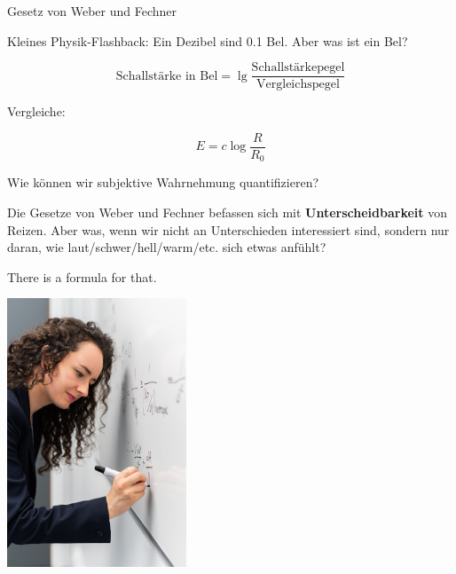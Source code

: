 \documentclass{beamer}
\begin{document}
\begin{frame}{Gesetz von Weber und Fechner}

Kleines Physik-Flashback: Ein Dezibel sind 0.1 Bel. Aber was ist ein Bel? 


\[
\text{Schallstärke in Bel} = \lg \frac{\text{Schallstärkepegel}}{\text{Vergleichspegel}} 
\]


Vergleiche: 

\[
E = c\log \frac{R}{R_0}
\]


    
\end{frame}




\begin{frame}{Wie können wir subjektive Wahrnehmung quantifizieren?}


Die Gesetze von Weber und Fechner befassen sich mit \textbf{Unterscheidbarkeit} von Reizen. Aber was, wenn wir nicht an Unterschieden interessiert sind, sondern nur daran, wie laut/schwer/hell/warm/etc. sich etwas anfühlt? 


There is a formula for that. 

\begin{center}
    \includegraphics[width=0.4\textwidth]{thisisengineering-raeng-fgdmH3iqvMw-unsplash.jpg}
\end{center}


\end{frame}
\end{document}
